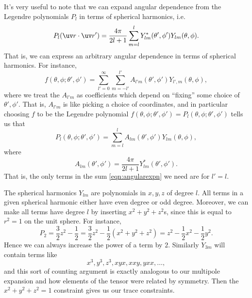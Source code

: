 It's very useful to note that we can expand angular dependence from the Legendre polynomials $P_l$ in terms of spherical harmonics, i.e.
\begin{equation}\label{eqn:legendreandspherical}
    P_l(\uv r \cdot \uv r') = \frac{4\pi}{2l+1} \sum_{m=l}^l Y_{lm}^*(\theta',\phi') Y_{lm}(\theta, \phi).
\end{equation}
That is, we can express an arbitrary angular dependence in terms of spherical harmonics. For instance,
\begin{equation}\label{eqn:angularexpn}
    f(\theta,\phi;\theta',\phi') = \sum_{l'=0}^\infty \sum_{m=-l'}^{l'} A_{l' m}(\theta',\phi') Y_{l',m}(\theta, \phi),
\end{equation}
where we treat the $A_{l'm}$ as coefficients which depend on ``fixing'' some choice of $\theta',\phi'$. That is, $A_{l'm}$ is like picking a choice of coordinates, and in particular choosing $f$ to be the Legendre polynomial $f(\theta,\phi;\theta',\phi')=P_l(\theta,\phi;\theta',\phi')$ tells us that
\begin{equation}
    P_l (\theta, \phi; \theta', \phi') = \sum_{m=l}^l A_{lm}(\theta',\phi') Y_{lm}(\theta, \phi),
\end{equation}
where
\begin{equation}
    A_{lm}(\theta',\phi') = \frac{4\pi}{2l+1} Y_{lm}^*(\theta',\phi').
\end{equation}
That is, the only terms in the sum \eqref{eqn:angularexpn} we need are for $l'=l$.

The spherical harmonics $Y_{lm}$ are polynomials in $x,y,z$ of degree $l$. All terms in a given spherical harmonic either have even degree or odd degree. Moreover, we can make all terms have degree $l$ by inserting $x^2+y^2 +z^2$s, since this is equal to $r^2=1$ on the unit sphere. For instance,
\begin{equation}
    P_2 = \frac{3}{2}z^2 - \frac{1}{2} = \frac{3}{2} z^2 - \frac{1}{2}(x^2+y^2+z^2) = z^2 - \frac{1}{2}x^2 -\frac{1}{2}y^2.
\end{equation}
Hence we can always increase the power of a term by $2$. Similarly $Y_{3m}$ will contain terms like 
\begin{equation*}
    x^3, y^3, z^3, xyx, xxy, yxx, \dots,
\end{equation*}
and this sort of counting argument is exactly analogous to our multipole expansion and how elements of the tensor were related by symmetry. Then the $x^2+y^2+z^2=1$ constraint gives us our trace constraints.

